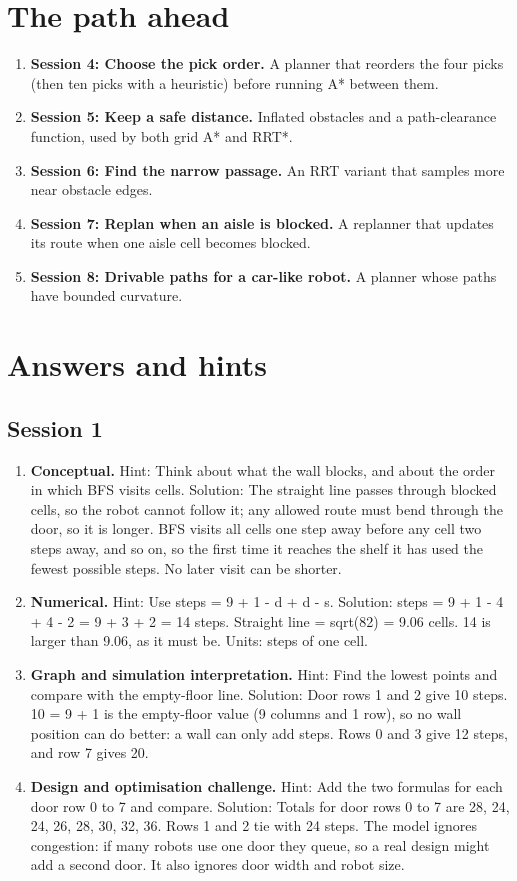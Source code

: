 \documentclass[11pt,a4paper]{article}
\begin{document}
\section{The path ahead}
\begin{enumerate}[nosep]
\item \textbf{Session 4: Choose the pick order.} A planner that reorders the four picks (then ten picks with a heuristic) before running A* between them.
\item \textbf{Session 5: Keep a safe distance.} Inflated obstacles and a path-clearance function, used by both grid A* and RRT*.
\item \textbf{Session 6: Find the narrow passage.} An RRT variant that samples more near obstacle edges.
\item \textbf{Session 7: Replan when an aisle is blocked.} A replanner that updates its route when one aisle cell becomes blocked.
\item \textbf{Session 8: Drivable paths for a car-like robot.} A planner whose paths have bounded curvature.
\end{enumerate}

\section{Answers and hints}

\subsection*{Session 1}
\begin{enumerate}[nosep]
\item \textbf{Conceptual.} Hint: Think about what the wall blocks, and about the order in which BFS visits cells. Solution: The straight line passes through blocked cells, so the robot cannot follow it; any allowed route must bend through the door, so it is longer. BFS visits all cells one step away before any cell two steps away, and so on, so the first time it reaches the shelf it has used the fewest possible steps. No later visit can be shorter.
\item \textbf{Numerical.} Hint: Use steps = 9 + \textbar{}1 - d\textbar{} + \textbar{}d - s\textbar{}. Solution: steps = 9 + \textbar{}1 - 4\textbar{} + \textbar{}4 - 2\textbar{} = 9 + 3 + 2 = 14 steps. Straight line = sqrt(82) = 9.06 cells. 14 is larger than 9.06, as it must be. Units: steps of one cell.
\item \textbf{Graph and simulation interpretation.} Hint: Find the lowest points and compare with the empty-floor line. Solution: Door rows 1 and 2 give 10 steps. 10 = 9 + 1 is the empty-floor value (9 columns and 1 row), so no wall position can do better: a wall can only add steps. Rows 0 and 3 give 12 steps, and row 7 gives 20.
\item \textbf{Design and optimisation challenge.} Hint: Add the two formulas for each door row 0 to 7 and compare. Solution: Totals for door rows 0 to 7 are 28, 24, 24, 26, 28, 30, 32, 36. Rows 1 and 2 tie with 24 steps. The model ignores congestion: if many robots use one door they queue, so a real design might add a second door. It also ignores door width and robot size.
\end{enumerate}
\end{document}
